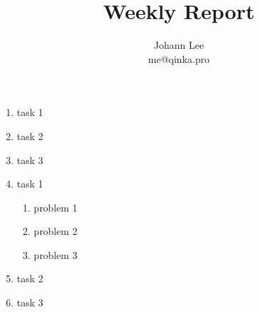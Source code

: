 \documentclass{weekly}
\title{Weekly Report}
\author{Johann Lee \\ me@qinka.pro}
\begin{document}
    \maketitle
    \thisweektask
        \begin{enumerate}
            \item task 1
            \item task 2
            \item task 3
            \item task 1
              \begin{enumerate}
              \item problem 1
              \item problem 2
              \item problem 3
              \end{enumerate}
            \item task 2
            \item task 3
        \end{enumerate}
    
\end{document}
